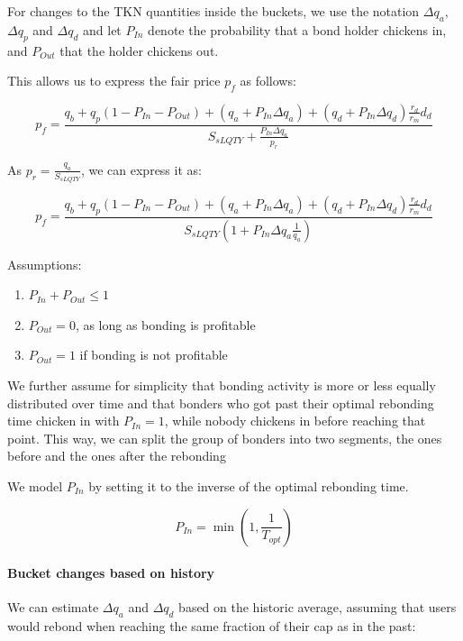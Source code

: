 \documentclass{article}
\begin{document}
For changes to the TKN quantities inside the buckets, we use the notation $\Delta q_{a}$, $\Delta q_{p}$ and $\Delta q_{d}$ and let $P_{In}$ denote the probability that a bond holder chickens in, and $P_{Out}$ that the holder chickens out.

This allows us to express the fair price $p_f$ as follows:

\begin{equation}
  \label{}
    p_{f} = \frac{q_{b}+q_{p}(1-P_{In}-P_{Out})+(q_{a}+ P_{In}\Delta q_{a})+(q_{d} + P_{In}\Delta q_{d})\frac{r_{d}}{r_{m}}d_{d}}{S_{sLQTY} + \frac{P_{In}\Delta q_a}{p_r}}
\end{equation}

As $p_r = \frac{q_a}{S_{sLQTY}}$, we can express it as:

\begin{equation}
  \label{eq:recursive_hist}
    p_{f} = \frac{q_{b}+q_{p}(1-P_{In}-P_{Out})+(q_{a}+ P_{In}\Delta q_{a})+(q_{d} + P_{In}\Delta q_{d})\frac{r_{d}}{r_{m}}d_{d}}{S_{sLQTY} \left( 1+P_{In} \Delta q_{a} \frac{1}{q_{a}} \right)}
\end{equation}

Assumptions:

\begin{enumerate}
	\item $P_{In} + P_{Out} \leq 1$
	\item $P_{Out} = 0$, as long as bonding is profitable
	\item $P_{Out} = 1$ if bonding is not profitable
\end{enumerate}

We further assume for simplicity that bonding activity is more or less equally distributed over time and that bonders who got past their optimal rebonding time chicken in with $P_{In}=1$, while nobody chickens in before reaching that point.
This way, we can split the group of bonders into two segments, the ones before and the ones after the rebonding

We model $P_{In}$ by setting it to the inverse of the optimal rebonding time.

\begin{equation}
    P_{In} = \min \left(1,\frac{1}{T_{opt}}\right)
\end{equation} 

\paragraph{Bucket changes based on history}
We can estimate $\Delta q_{a}$ and $\Delta q_{d}$ based on the historic average, assuming that users would rebond when reaching the same fraction of their cap as in the past:
\end{document}
